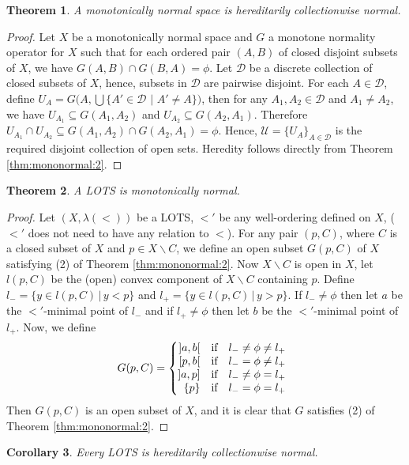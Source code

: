 \documentclass[12pt,oneside,english]{amsbook}
\numberwithin{equation}{section} %
\numberwithin{figure}{section} %
\theoremstyle{plain}
\numberwithin{section}{chapter}
\newtheorem{thm}{Theorem}[section]
\theoremstyle{plain}
\newtheorem{corollary}[thm]{Corollary}
\begin{document}
\begin{thm} \label{thm:mononormal:3}
  A monotonically normal space is hereditarily collectionwise normal.
\end{thm}
\begin{proof}
  Let $X$ be a monotonically normal space and $G$ a monotone normality operator for $X$ such that for each ordered pair $(A,B)$ of closed disjoint subsets of $X$, we have $G(A,B) \cap G(B,A) = \phi$. Let $\mathcal{D}$ be a discrete collection of closed subsets of $X$, hence, subsets in $\mathcal{D}$ are pairwise disjoint. For each $A \in \mathcal{D}$, define $U_{A} = G(A,\bigcup \{A' \in \mathcal{D}$ $|$ $A' \neq A \})$, then for any $A_{1},A_{2} \in \mathcal{D}$ and $A_{1} \neq A_{2}$, we have $U_{A_{1}} \subseteq G(A_{1},A_{2})$ and $U_{A_{2}} \subseteq G(A_{2},A_{1})$. Therefore $U_{A_{1}} \cap U_{A_{2}} \subseteq G(A_{1},A_2) \cap G(A_{2},A_1)  = \phi$. Hence, $\mathcal{U} = \{ U_{A} \}_{A \in \mathcal{D}}$ is the required disjoint collection of open sets.  Heredity follows directly from Theorem \ref{thm:mononormal:2}.
\end{proof}

\begin{thm} \label{thm:mononormal:4}
  A LOTS is monotonically normal.
\end{thm}
\begin{proof}
  Let $(X,\lambda (<))$ be a LOTS, $<'$ be any well-ordering defined on $X$, ($<'$ does not need to have any relation to $<$). For any pair $(p,C)$, where $C$ is a closed subset of $X$ and $p \in X \backslash C$, we define an open subset $G(p,C)$ of $X$ satisfying (2) of Theorem \ref{thm:mononormal:2}. Now $X \backslash C$ is open in $X$, let $l(p,C)$ be the (open) convex component of $X \backslash C$ containing $p$. Define $l_{-} = \{y \in l(p,C) \, | \, y < p\}$ and $l_{+} = \{ y \in l(p,C) \, | \, y > p \}$. If $l_{-} \neq \phi$ then let $a$ be the $<'$-minimal point of $l_{-}$ and if $l_{+} \neq \phi$ then let $b$ be the $<'$-minimal point of $l_{+}$.
  Now, we define
\[
    G(p,C) = \left\{
    \begin{array}{@{}rcl}
      {]a,b[} & \text{if} & l_- \neq \phi \neq l_+ \\
      {[p,b[} & \text{if} & l_- = \phi \neq l_+ \\
      {]a,p]}   & \text{if} & l_- \neq \phi = l_+ \\
      \{p\}   & \text{if} & l_- = \phi = l_+
    \end{array} \right.
  \]
  Then $G(p,C)$ is an open subset of $X$, and it is clear that $G$ satisfies (2) of Theorem \ref{thm:mononormal:2}. 
\end{proof}
\begin{corollary}
  Every LOTS is hereditarily collectionwise normal.
\end{corollary}
\end{document}
